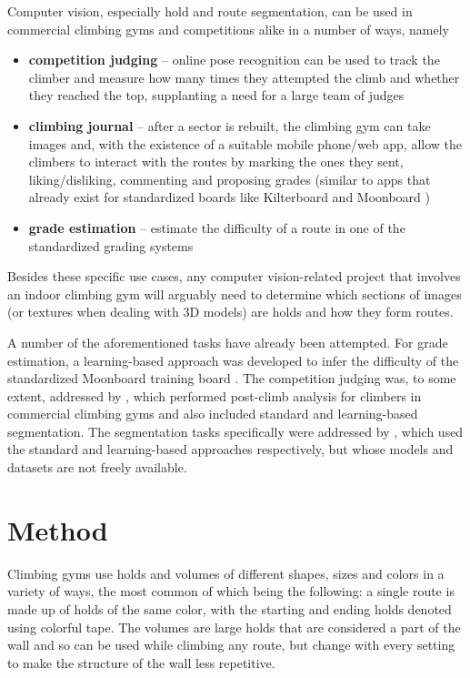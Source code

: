 \documentclass[final]{cvpr}
\begin{document}
Computer vision, especially hold and route segmentation, can be used in commercial climbing gyms and competitions alike in a number of ways, namely
\begin{itemize}
    \item \textbf{competition judging} -- online pose recognition can be used to track the climber and measure how many times they attempted the climb and whether they reached the top, supplanting a need for a large team of judges
    \item \textbf{climbing journal} -- after a sector is rebuilt, the climbing gym can take images and, with the existence of a suitable mobile phone/web app, allow the climbers to interact with the routes by marking the ones they sent, liking/disliking, commenting and proposing grades (similar to apps that already exist for standardized boards like Kilterboard \cite{Kilterboard} and Moonboard \cite{Moonboard})
    \item \textbf{grade estimation} -- estimate the difficulty of a route in one of the standardized grading systems
\end{itemize}

Besides these specific use cases, any computer vision-related project that involves an indoor climbing gym will arguably need to determine which sections of images (or textures when dealing with 3D models) are holds and how they form routes. 

A number of the aforementioned tasks have already been attempted.
For grade estimation, a learning-based approach was developed \cite{MLRouteClassification} to infer the difficulty of the standardized Moonboard training board \cite{Moonboard}.
The competition judging was, to some extent, addressed by \cite{ClimbingAnalysis}, which performed post-climb analysis for climbers in commercial climbing gyms and also included standard and learning-based segmentation.
The segmentation tasks specifically were addressed by \cite{Climbnet,WeiDisplayer}, which used the standard and learning-based approaches respectively, but whose models and datasets are not freely available.


\section{Method}

Climbing gyms use holds and volumes of different shapes, sizes and colors in a variety of ways, the most common of which being the following: a single route is made up of holds of the same color, with the starting and ending holds denoted using colorful tape.
The volumes are large holds that are considered a part of the wall and so can be used while climbing any route, but change with every setting to make the structure of the wall less repetitive.
\end{document}
